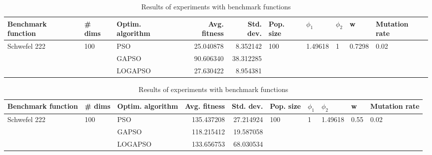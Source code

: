\documentclass{article}
\begin{document}
\begin{table}
\centering
\caption{Results of experiments with benchmark functions}
\begin{tabular}{lllrrlllll}
\toprule
           Benchmark function &              \# dims & Optim. algorithm &  Avg. fitness &  Std. dev. &            Pop. size &               $\phi_{1}$ &         $\phi_{2}$ &                       w &         Mutation rate \\
\midrule
\multirow{3}{*}{Schwefel 222} & \multirow{3}{*}{100} &              PSO &     25.040878 &   8.352142 & \multirow{3}{*}{100} & \multirow{3}{*}{1.49618} & \multirow{3}{*}{1} & \multirow{3}{*}{0.7298} & \multirow{3}{*}{0.02} \\
                              &                      &            GAPSO &     90.606340 &  38.312285 &                      &                          &                    &                         &                       \\
                              &                      &          LOGAPSO &     27.630422 &   8.954381 &                      &                          &                    &                         &                       \\
\bottomrule
\end{tabular}
\end{table}
\begin{table}
\centering
\caption{Results of experiments with benchmark functions}
\begin{tabular}{lllrrlllll}
\toprule
           Benchmark function &              \# dims & Optim. algorithm &  Avg. fitness &  Std. dev. &            Pop. size &         $\phi_{1}$ &               $\phi_{2}$ &                     w &         Mutation rate \\
\midrule
\multirow{3}{*}{Schwefel 222} & \multirow{3}{*}{100} &              PSO &    135.437208 &  27.214924 & \multirow{3}{*}{100} & \multirow{3}{*}{1} & \multirow{3}{*}{1.49618} & \multirow{3}{*}{0.55} & \multirow{3}{*}{0.02} \\
                              &                      &            GAPSO &    118.215412 &  19.587058 &                      &                    &                          &                       &                       \\
                              &                      &          LOGAPSO &    133.656753 &  68.030534 &                      &                    &                          &                       &                       \\
\bottomrule
\end{tabular}
\end{table}
\end{document}
